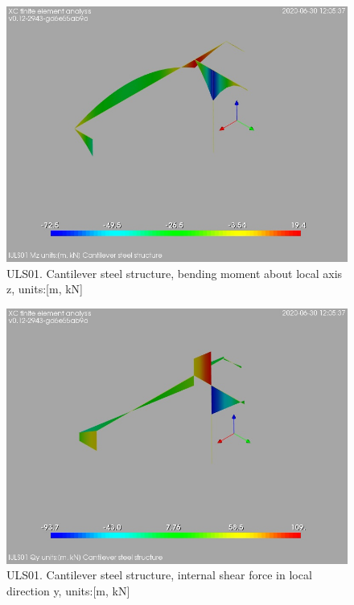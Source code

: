 \begin{figure}
\begin{center}
\includegraphics[width=\linewidth]{ramp_wall/resLC/text/graphics/resSimplLC/lULS01steelMembersMz}
\caption{ULS01. Cantilever steel structure, bending moment about local axis z, units:[m, kN]}
\end{center}
\end{figure}
\begin{figure}
\begin{center}
\includegraphics[width=\linewidth]{ramp_wall/resLC/text/graphics/resSimplLC/lULS01steelMembersQy}
\caption{ULS01. Cantilever steel structure, internal shear force in local direction y, units:[m, kN]}
\end{center}
\end{figure}
